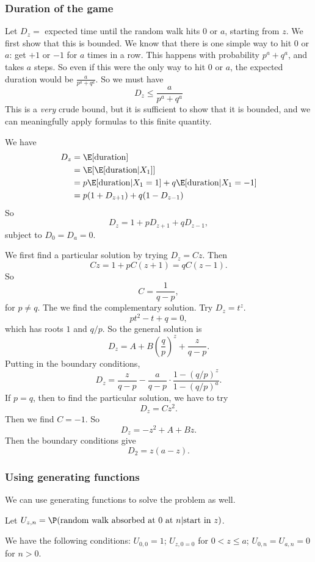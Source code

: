 \documentclass[a4paper]{article}
\begin{document}
\subsubsection*{Duration of the game}
Let $D_z =$ expected time until the random walk hits $0$ or $a$, starting from $z$. We first show that this is bounded. We know that there is one simple way to hit $0$ or $a$: get $+1$ or $-1$ for $a$ times in a row. This happens with probability $p^a + q^a$, and takes $a$ steps. So even if this were the only way to hit $0$ or $a$, the expected duration would be $\frac{a}{p^a + q^a}$. So we must have
\[
  D_z \leq \frac{a}{p^a + q^a}
\]
This is a \emph{very} crude bound, but it is sufficient to show that it is bounded, and we can meaningfully apply formulas to this finite quantity.

We have
\begin{align*}
  D_z &= \E[\text{duration}]\\
  &= \E[\E[\text{duration}|X_1]]\\
  &= p\E[\text{duration}|X_1 = 1] + q\E[\text{duration}|X_1 = -1]\\
  &= p(1 + D_{z + 1}) + q(1 - D_{z - 1})
\end{align*}
So
\[
  D_z = 1 + pD_{z + 1} + qD_{z - 1},
\]
subject to $D_0 = D_a = 0$.

We first find a particular solution by trying $D_z = Cz$. Then
\[
  Cz = 1 + pC(z + 1) = qC(z - 1).
\]
So
\[
  C = \frac{1}{q - p},
\]
for $p \not = q$. The we find the complementary solution. Try $D_z = t^z$.
\[
  pt^2 - t + q = 0,
\]
which has roots $1$ and $q/p$. So the general solution is
\[
  D_z = A + B\left(\frac{q}{p}\right)^z + \frac{z}{q - p}.
\]
Putting in the boundary conditions,
\[
  D_z = \frac{z}{q - p} - \frac{a}{q - p} \cdot \frac{1 - (q/p)^z}{1 - (q/p)^a}.
\]
If $p = q$, then to find the particular solution, we have to try
\[
  D_z = Cz^2.
\]
Then we find $C = -1$. So
\[
  D_z = -z^2 + A + Bz.
\]
Then the boundary conditions give
\[
  D_2 = z(a - z).
\]
\subsubsection*{Using generating functions}
We can use generating functions to solve the problem as well.

Let $U_{z,n} = \P(\text{random walk absorbed at 0 at }n|\text{start in }z)$.

We have the following conditions: $U_{0, 0} = 1$; $U_{z, 0 = 0}$ for $0 < z \leq a$; $U_{0, n} = U_{a, n} = 0$ for $n > 0$.
\end{document}

